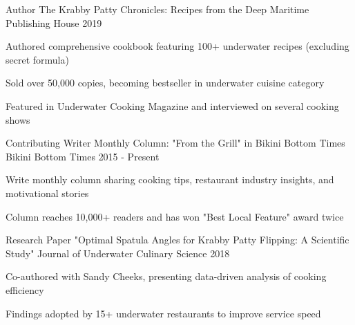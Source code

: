 \begin{cventries}

  \cventry
    {Author} %
    {The Krabby Patty Chronicles: Recipes from the Deep} %
    {Maritime Publishing House} %
    {2019} %
    {
      \begin{cvitems}
        \item {Authored comprehensive cookbook featuring 100+ underwater recipes (excluding secret formula)}
        \item {Sold over 50,000 copies, becoming bestseller in underwater cuisine category}
        \item {Featured in Underwater Cooking Magazine and interviewed on several cooking shows}
      \end{cvitems}
    }

  \cventry
    {Contributing Writer} %
    {Monthly Column: "From the Grill" in Bikini Bottom Times} %
    {Bikini Bottom Times} %
    {2015 - Present} %
    {
      \begin{cvitems}
        \item {Write monthly column sharing cooking tips, restaurant industry insights, and motivational stories}
        \item {Column reaches 10,000+ readers and has won "Best Local Feature" award twice}
      \end{cvitems}
    }

  \cventry
    {Research Paper} %
    {"Optimal Spatula Angles for Krabby Patty Flipping: A Scientific Study"} %
    {Journal of Underwater Culinary Science} %
    {2018} %
    {
      \begin{cvitems}
        \item {Co-authored with Sandy Cheeks, presenting data-driven analysis of cooking efficiency}
        \item {Findings adopted by 15+ underwater restaurants to improve service speed}
      \end{cvitems}
    }

\end{cventries}
